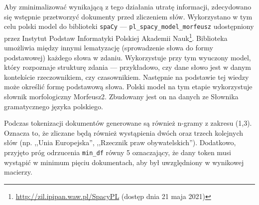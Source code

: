 		Aby zminimalizować wynikającą z tego działania utratę informacji, zdecydowano się wstępnie przetworzyć dokumenty przed zliczeniem słów.
		Wykorzystano w tym celu polski model do biblioteki \verb|spaCy|
			--- \verb|pl_spacy_model_morfeusz|\cite{spacy_pl} udostępniony przez Instytut Podstaw Informatyki Polskiej Akademii Nauk\footnote{\url{http://zil.ipipan.waw.pl/SpacyPL} (dostęp dnia 21 maja 2021)}.
		Biblioteka umożliwia między innymi lematyzację (sprowadzenie słowa do formy podstawowej) każdego słowa w zdaniu.
		Wykorzystuje przy tym wyuczony model, który rozpoznaje strukturę zdania --- przykładowo, czy dane słowo jest w danym kontekście rzeczownikiem, czy czasownikiem.
		Następnie na podstawie tej wiedzy może określić formę podstawową słowa.
		Polski model na tym etapie wykorzystuje słownik morfologiczny Morfeusz2\cite{morfeusz}.
		Zbudowany jest on na danych ze Słownika gramatycznego języka polskiego.

		Podczas tokenizacji dokumentów generowane są również n-gramy z zakresu (1,3).
		Oznacza to, że zliczane będą również wystąpienia dwóch oraz trzech kolejnych słów (np. ,,Unia Europejska'', ,,Rzecznik praw obywatelskich'').
		Dodatkowo, przyjęto próg odrzucenia \verb|min_df| równy 5 oznaczający, że dany token musi wystąpić w minimum pięciu dokumentach,
			aby był uwzględniony w wynikowej macierzy.
